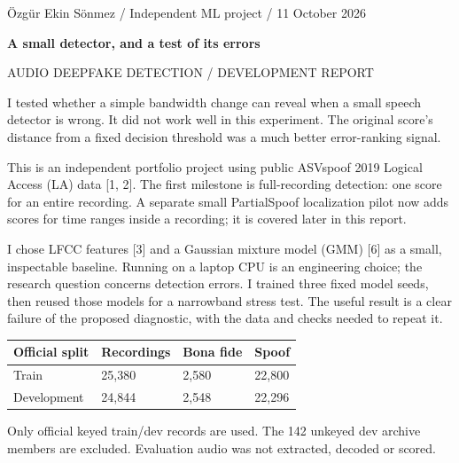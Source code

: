 \documentclass[10pt,a4paper]{article}
\newcommand{\reporttitle}[1]{{\color{navy}\Large\bfseries #1}\par\vspace{5pt}}
\begin{document}
{\small Özgür Ekin Sönmez / Independent ML project / 11 October 2026}\par

\reporttitle{A small detector, and a test of its errors}

{\small AUDIO DEEPFAKE DETECTION / DEVELOPMENT REPORT}\par

{\color{navy}\large I tested whether a simple bandwidth change can reveal when a small speech detector is wrong. It did not work well in this experiment. The original score's distance from a fixed decision threshold was a much better error-ranking signal.}\par

\par

This is an independent portfolio project using public ASVspoof 2019 Logical Access (LA) data [1, 2]. The first milestone is full-recording detection: one score for an entire recording. A separate small PartialSpoof localization pilot now adds scores for time ranges inside a recording; it is covered later in this report.\par

I chose LFCC features [3] and a Gaussian mixture model (GMM) [6] as a small, inspectable baseline. Running on a laptop CPU is an engineering choice; the research question concerns detection errors. I trained three fixed model seeds, then reused those models for a narrowband stress test. The useful result is a clear failure of the proposed diagnostic, with the data and checks needed to repeat it.\par

\begin{center}\small

\begin{tabular}{@{}llll@{}}\toprule

Official split & Recordings & Bona fide & Spoof \\

\midrule

Train & 25,380 & 2,580 & 22,800 \\

Development & 24,844 & 2,548 & 22,296 \\

\bottomrule\end{tabular}\end{center}

{\small Only official keyed train/dev records are used. The 142 unkeyed dev archive members are excluded. Evaluation audio was not extracted, decoded or scored.}\par
\end{document}
